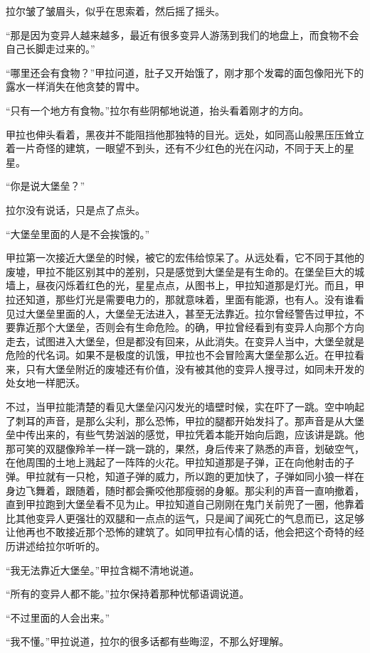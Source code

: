 拉尔皱了皱眉头，似乎在思索着，然后摇了摇头。

“那是因为变异人越来越多，最近有很多变异人游荡到我们的地盘上，而食物不会自己长脚走过来的。”

“哪里还会有食物？”甲拉问道，肚子又开始饿了，刚才那个发霉的面包像阳光下的露水一样消失在他贪婪的胃中。

“只有一个地方有食物。”拉尔有些阴郁地说道，抬头看着刚才的方向。

甲拉也伸头看着，黑夜并不能阻挡他那独特的目光。远处，如同高山般黑压压耸立着一片奇怪的建筑，一眼望不到头，还有不少红色的光在闪动，不同于天上的星星。

“你是说大堡垒？”

拉尔没有说话，只是点了点头。

“大堡垒里面的人是不会挨饿的。”

甲拉第一次接近大堡垒的时候，被它的宏伟给惊呆了。从远处看，它不同于其他的废墟，甲拉不能区别其中的差别，只是感觉到大堡垒是有生命的。在堡垒巨大的城墙上，昼夜闪烁着红色的光，星星点点，从图书上，甲拉知道那是灯光。而且，甲拉还知道，那些灯光是需要电力的，那就意味着，里面有能源，也有人。没有谁看见过大堡垒里面的人，大堡垒无法进入，甚至无法靠近。拉尔曾经警告过甲拉，不要靠近那个大堡垒，否则会有生命危险。的确，甲拉曾经看到有变异人向那个方向走去，试图进入大堡垒，但是都没有回来，从此消失。在变异人当中，大堡垒就是危险的代名词。如果不是极度的讥饿，甲拉也不会冒险离大堡垒那么近。在甲拉看来，只有大堡垒附近的废墟还有价值，没有被其他的变异人搜寻过，如同未开发的处女地一样肥沃。

不过，当甲拉能清楚的看见大堡垒闪闪发光的墙壁时候，实在吓了一跳。空中响起了刺耳的声音，是那么尖利，那么恐怖，甲拉的腿都开始发抖了。那声音是从大堡垒中传出来的，有些气势汹汹的感觉，甲拉凭着本能开始向后跑，应该讲是跳。他那可笑的双腿像羚羊一样一跳一跳的，果然，身后传来了熟悉的声音，划破空气，在他周围的土地上溅起了一阵阵的火花。甲拉知道那是子弹，正在向他射击的子弹。甲拉就有一只枪，知道子弹的威力，所以跑的更加快了，子弹如同小狼一样在身边飞舞着，跟随着，随时都会撕咬他那瘦弱的身躯。那尖利的声音一直响撤着，直到甲拉跑到大堡垒看不见为止。甲拉知道自己刚刚在鬼门关前兜了一圈，他靠着比其他变异人更强壮的双腿和一点点的运气，只是闻了闻死亡的气息而已，这足够让他再也不敢接近那个恐怖的建筑了。如同甲拉有心情的话，他会把这个奇特的经历讲述给拉尔听听的。

“我无法靠近大堡垒。”甲拉含糊不清地说道。

“所有的变异人都不能。”拉尔保持着那种忧郁语调说道。

“不过里面的人会出来。”

“我不懂。”甲拉说道，拉尔的很多话都有些晦涩，不那么好理解。

